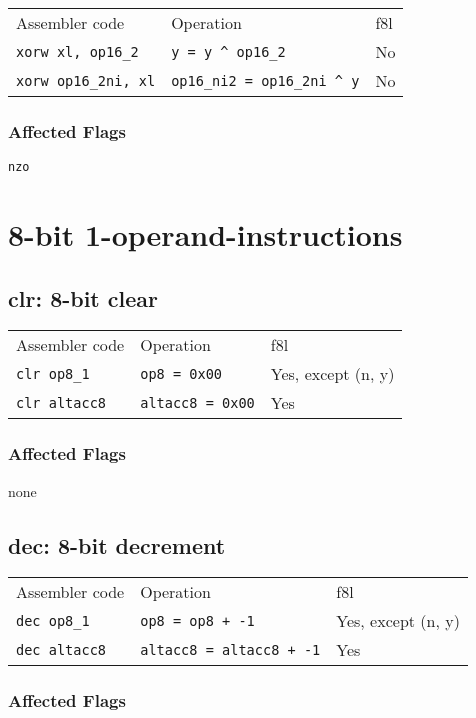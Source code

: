 \documentclass{book}
\begin{document}
\begin{tabular}{l l l}
Assembler code              & Operation                             & f8l \\
\texttt{xorw xl, op16\_2}   & \texttt{y = y \^{} op16\_2}           & No \\
\texttt{xorw op16\_2ni, xl} & \texttt{op16\_ni2 = op16\_2ni \^{} y} & No
\end{tabular}

\subsubsection*{Affected Flags}

\texttt{nzo}


\section{8-bit 1-operand-instructions}

\subsection{clr: 8-bit clear}

\begin{tabular}{l l l}
Assembler code       & Operation               & f8l \\
\texttt{clr op8\_1}  & \texttt{op8 = 0x00}     & Yes, except (n, y) \\
\texttt{clr altacc8} & \texttt{altacc8 = 0x00} & Yes
\end{tabular}

\subsubsection*{Affected Flags}

none


\subsection{dec: 8-bit decrement}

\begin{tabular}{l l l}
Assembler code       & Operation                       & f8l \\
\texttt{dec op8\_1}  & \texttt{op8 = op8 + -1}         & Yes, except (n, y) \\
\texttt{dec altacc8} & \texttt{altacc8 = altacc8 + -1} & Yes
\end{tabular}

\subsubsection*{Affected Flags}
\end{document}
